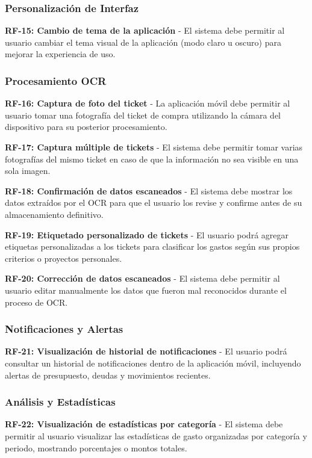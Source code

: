 \subsubsection{Personalización de Interfaz}
\textbf{RF-15: Cambio de tema de la aplicación} - El sistema debe permitir al usuario cambiar el tema visual de la aplicación (modo claro u oscuro) para mejorar la experiencia de uso.

\subsubsection{Procesamiento OCR}
\textbf{RF-16: Captura de foto del ticket} - La aplicación móvil debe permitir al usuario tomar una fotografía del ticket de compra utilizando la cámara del dispositivo para su posterior procesamiento.

\textbf{RF-17: Captura múltiple de tickets} - El sistema debe permitir tomar varias fotografías del mismo ticket en caso de que la información no sea visible en una sola imagen.

\textbf{RF-18: Confirmación de datos escaneados} - El sistema debe mostrar los datos extraídos por el OCR para que el usuario los revise y confirme antes de su almacenamiento definitivo.

\textbf{RF-19: Etiquetado personalizado de tickets} - El usuario podrá agregar etiquetas personalizadas a los tickets para clasificar los gastos según sus propios criterios o proyectos personales.

\textbf{RF-20: Corrección de datos escaneados} - El sistema debe permitir al usuario editar manualmente los datos que fueron mal reconocidos durante el proceso de OCR.

\subsubsection{Notificaciones y Alertas}
\textbf{RF-21: Visualización de historial de notificaciones} - El usuario podrá consultar un historial de notificaciones dentro de la aplicación móvil, incluyendo alertas de presupuesto, deudas y movimientos recientes.

\subsubsection{Análisis y Estadísticas}
\textbf{RF-22: Visualización de estadísticas por categoría} - El sistema debe permitir al usuario visualizar las estadísticas de gasto organizadas por categoría y periodo, mostrando porcentajes o montos totales.

